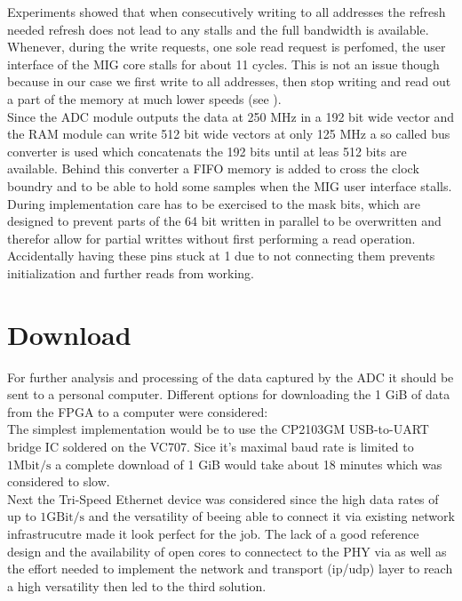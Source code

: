 Experiments showed that when consecutively writing to all addresses the
refresh needed refresh does not lead to any stalls and the full bandwidth
is available. Whenever, during the write requests, one sole read request
is perfomed, the user interface of the \gls{MIG} core stalls for about 11
cycles. This is not an issue though because in our case we first write
to all addresses, then stop writing and read out a part of the memory
at much lower speeds (see ). \\

Since the \gls{ADC} module outputs the data at 250 MHz in a 192 bit
wide vector and the \gls{RAM} module can write 512 bit wide vectors
at only 125 MHz a so called bus converter is used which concatenats
the 192 bits until at leas 512 bits are available. Behind this converter
a \gls{FIFO} memory is added to cross the clock boundry and to be able
to hold some samples when the \gls{MIG} user interface stalls. \\

During implementation care has to be exercised to the mask bits,
which are designed to prevent parts of the 64 bit written in parallel to be
overwritten and therefor allow for partial writtes without first performing
a read operation. Accidentally having these pins stuck at 1 due to
not connecting them prevents initialization and further reads from
working. \\

\section{Download}
\label{sec:fpga_download}
For further analysis and processing of the data captured by the \gls{ADC}
it should be sent to a personal computer.
Different options for downloading the 1 GiB of data from the \gls{FPGA}
to a computer were considered: \\

The simplest implementation would be to use
the CP2103GM USB-to-UART bridge IC soldered on the VC707. Sice it's
maximal baud rate is limited to $1 \text{Mbit}/\text{s}$ a complete
download of 1 GiB would take about 18 minutes which was considered to slow. \\

Next the Tri-Speed Ethernet  device was considered since
the high data rates of up to $1 \text{GBit}/\text{s}$ and the versatility
of beeing able to connect it via existing network infrastrucutre made
it look perfect for the job. The lack of a good reference design and the
availability of open cores to connectect to the \gls{PHY} via 
 as well as the effort needed to implement
the network and transport (ip/udp) layer to reach a high
versatility then led to the third solution. \\

